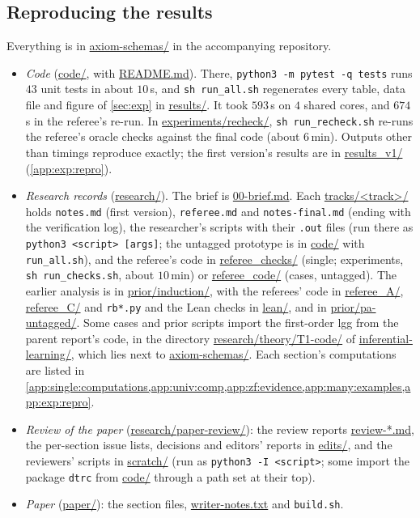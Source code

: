 \subsection{Reproducing the results}\label{app:ver:repro}

Everything is in \url{axiom-schemas/} in the accompanying repository.
\begin{itemize}
\item \emph{Code} (\url{code/}, with \url{README.md}). There, \texttt{python3 -m pytest -q tests} runs $43$ unit
tests in about $10$\,s, and \texttt{sh run\_all.sh} regenerates every table, data file and figure of \cref{sec:exp} in
\url{results/}. It took $593$\,s on $4$ shared cores, and $674$\,s in the referee's re-run. In
\url{experiments/recheck/}, \texttt{sh run\_recheck.sh} re-runs the referee's oracle checks against the final code
(about $6$\,min). Outputs other than timings reproduce exactly; the first version's results are in
\url{results_v1/} (\cref{app:exp:repro}).
\item \emph{Research records} (\url{research/}). The brief is \url{00-brief.md}. Each \url{tracks/<track>/} holds
\texttt{notes.md} (first version), \texttt{referee.md} and \texttt{notes-final.md} (ending with the verification log),
the researcher's scripts with their \texttt{.out} files (run there as \texttt{python3 <script> [args]}; the untagged
prototype is in \url{code/} with \texttt{run\_all.sh}), and the referee's code in \url{referee_checks/} (single;
experiments, \texttt{sh run\_checks.sh}, about $10$\,min) or \url{referee_code/} (cases, untagged). The earlier analysis is in
\url{prior/induction/}, with the referees' code in \url{referee_A/}, \url{referee_C/} and \texttt{rb*.py} and the Lean
checks in \url{lean/}, and in \url{prior/pa-untagged/}. Some cases and prior scripts import the first-order lgg from the
parent report's code, in the directory \url{research/theory/T1-code/} of \url{inferential-learning/}, which lies next to
\url{axiom-schemas/}.
Each section's computations are listed in
\cref{app:single:computations,app:univ:comp,app:zf:evidence,app:many:examples,app:exp:repro}.
\item \emph{Review of the paper} (\url{research/paper-review/}): the review reports \url{review-*.md}, the per-section
issue lists, decisions and editors' reports in \url{edits/}, and the reviewers' scripts in \url{scratch/} (run as
\texttt{python3 -I <script>}; some import the package \texttt{dtrc} from \url{code/} through a path set at their top).
\item \emph{Paper} (\url{paper/}): the section files, \url{writer-notes.txt} and \texttt{build.sh}.
\end{itemize}
